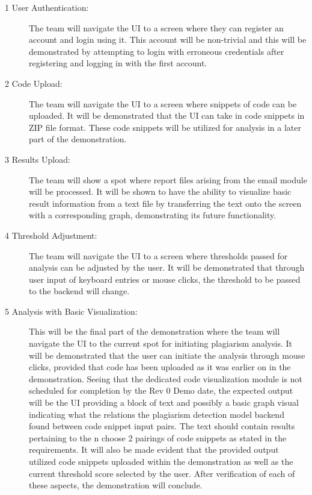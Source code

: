 \documentclass{article}
\begin{document}
\begin{description}
    \item[1 User Authentication:] The team will navigate the UI to a screen where they can 
    register an account and login using it. This account will be non-trivial and this will 
    be demonstrated by attempting to login with erroneous credentials after registering and 
    logging in with the first account.

    \item[2 Code Upload:] The team will navigate the UI to a screen where snippets of code 
    can be uploaded. It will be demonstrated that the UI can take in code snippets in ZIP file 
    format. These code snippets will be utilized for analysis in a later part of the demonstration.

    \item[3 Results Upload:] The team will show a spot where report files arising from the email 
    module will be processed. It will be shown to have the ability to visualize basic result 
    information from a text file by transferring the text onto the screen with a corresponding graph, 
    demonstrating its future functionality.

    \item[4 Threshold Adjustment:] The team will navigate the UI to a screen where thresholds passed
    for analysis can be adjusted by the user. It will be demonstrated that through user input 
    of keyboard entries or mouse clicks, the threshold to be passed to the backend will change.

    \item[5 Analysis with Basic Visualization:] This will be the final part of the demonstration where 
    the team will navigate the UI to the current spot for initiating plagiarism analysis. It will be 
    demonstrated that the user can initiate the analysis through mouse clicks, provided that code has 
    been uploaded as it was earlier on in the demonstration. Seeing that the dedicated code visualization 
    module is not scheduled for completion by the Rev 0 Demo date, the expected output will be the UI providing 
    a block of text and possibly a basic graph visual indicating what the relations the plagiarism detection model
    backend found between code snippet input pairs. The text should contain results pertaining to the n choose 2 
    pairings of code snippets as stated in the requirements. It will also be made evident that the provided output 
    utilized code snippets uploaded within the demonstration as well as the current threshold score selected by the user. 
    After verification of each of these aspects, the demonstration will conclude.

\end{description}
\end{document}
